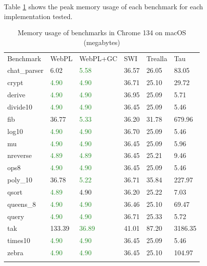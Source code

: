 Table \ref{tab:chrome-memory} shows the peak memory usage of each benchmark for each implementation tested.

\begin{table}[H]
\centering
{}
\begin{tabular}{llllll}
\addlinespace\hline\addlinespace
Benchmark & WebPL & WebPL+GC & SWI & Trealla & Tau \\
\addlinespace\hline\addlinespace
chat\_parser & 6.02 & \textcolor{ForestGreen}{5.58} & 36.57 & 26.05 & 83.05 \\
crypt & \textcolor{ForestGreen}{4.90} & \textcolor{ForestGreen}{4.90} & 36.71 & 25.10 & 29.72 \\
derive & \textcolor{ForestGreen}{4.90} & \textcolor{ForestGreen}{4.90} & 36.95 & 25.09 & 5.71 \\
divide10 & \textcolor{ForestGreen}{4.90} & \textcolor{ForestGreen}{4.90} & 36.45 & 25.09 & 5.46 \\
fib & 36.77 & \textcolor{ForestGreen}{5.33} & 36.20 & 31.78 & 679.96 \\
log10 & \textcolor{ForestGreen}{4.90} & \textcolor{ForestGreen}{4.90} & 36.70 & 25.09 & 5.46 \\
mu & \textcolor{ForestGreen}{4.90} & \textcolor{ForestGreen}{4.90} & 36.45 & 25.09 & 5.96 \\
nreverse & \textcolor{ForestGreen}{4.89} & \textcolor{ForestGreen}{4.89} & 36.45 & 25.21 & 9.46 \\
ops8 & \textcolor{ForestGreen}{4.90} & \textcolor{ForestGreen}{4.90} & 36.45 & 25.09 & 5.46 \\
poly\_10 & 36.78 & \textcolor{ForestGreen}{5.22} & 36.71 & 35.84 & 227.97 \\
qsort & \textcolor{ForestGreen}{4.89} & 4.90 & 36.20 & 25.22 & 7.03 \\
queens\_8 & \textcolor{ForestGreen}{4.90} & \textcolor{ForestGreen}{4.90} & 36.46 & 25.10 & 69.47 \\
query & \textcolor{ForestGreen}{4.90} & \textcolor{ForestGreen}{4.90} & 36.71 & 25.33 & 5.72 \\
tak & 133.39 & \textcolor{ForestGreen}{36.89} & 41.01 & 87.20 & 3186.35 \\
times10 & \textcolor{ForestGreen}{4.90} & \textcolor{ForestGreen}{4.90} & 36.45 & 25.09 & 5.46 \\
zebra & \textcolor{ForestGreen}{4.90} & \textcolor{ForestGreen}{4.90} & 36.45 & 25.10 & 104.97 \\
\addlinespace\hline\addlinespace
\end{tabular}
\caption{Memory usage of benchmarks in Chrome 134 on macOS (megabytes)}
\label{tab:chrome-memory}
\end{table}

